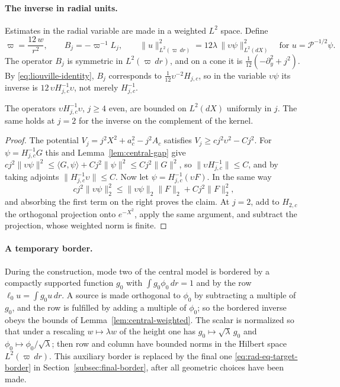 \paragraph{The inverse in radial units.}
Estimates in the radial variable are made in a weighted $L^2$ space.
Define
\begin{equation}\label{eq:rad-eq-ha2}
 \varpi=\frac{12\,w}{r^2},\qquad B_j=-\varpi^{-1}L_j,
 \qquad
 \|u\|_{L^2(\varpi\,dr)}^2=12\lambda\,\|\upsilon\psi\|_{L^2(dX)}^2
 \quad\text{for }u=\mathcal P^{-1/2}\psi .
\end{equation}
The operator $B_j$ is symmetric in $L^2(\varpi\,dr)$, and on a cone it
is $\tfrac1{12}(-\partial_y^2+j^2)$. By \eqref{eq:liouville-identity},
$B_j$ corresponds to $\tfrac1{12}\upsilon^{-2}H_{j,c}$, so in the
variable $\upsilon\psi$ its inverse is
$12\,\upsilon H_{j,c}^{-1}\upsilon$, not merely $H_{j,c}^{-1}$.

\begin{lemma}\label{lem:central-weighted}
The operators $\upsilon H_{j,c}^{-1}\upsilon$, $j\ge4$ even, are
bounded on $L^2(dX)$ uniformly in $j$. The same holds at $j=2$ for the
inverse on the complement of the kernel.
\end{lemma}

\begin{proof}
The potential $V_j=j^2X^2+a_c^2-j^2A_c$ satisfies
$V_j\ge cj^2\upsilon^2-Cj^2$. For $\psi=H_{j,c}^{-1}G$ this and
Lemma~\ref{lem:central-gap} give
$cj^2\|\upsilon\psi\|^2\le\langle G,\psi\rangle+Cj^2\|\psi\|^2
 \le Cj^2\|G\|^2$,
so $\|\upsilon H_{j,c}^{-1}\|\le C$, and by taking adjoints
$\|H_{j,c}^{-1}\upsilon\|\le C$. Now let
$\psi=H_{j,c}^{-1}(\upsilon F)$. In the same way
\[
 cj^2\|\upsilon\psi\|_2^2
 \le\|\upsilon\psi\|_2\|F\|_2+Cj^2\|F\|_2^2 ,
\]
and absorbing the first term on the right proves the claim. At $j=2$,
add to $H_{2,c}$ the orthogonal projection onto $e^{-X^2}$, apply the
same argument, and subtract the projection, whose weighted norm is
finite.
\end{proof}

\paragraph{A temporary border.}
During the construction, mode two of the central model is bordered by
a compactly supported function $g_0$ with $\int g_0\phi_0\,dr=1$ and
by the row $\ell_0u=\int g_0u\,dr$. A source is made orthogonal to
$\phi_0$ by subtracting a multiple of $g_0$, and the row is fulfilled
by adding a multiple of $\phi_0$; so the bordered inverse obeys the
bounds of Lemma~\ref{lem:central-weighted}. The scalar is normalized
so that under a rescaling $w\mapsto\lambda w$ of the height one has
$g_0\mapsto\sqrt\lambda\,g_0$ and $\phi_0\mapsto\phi_0/\sqrt\lambda$;
then row and column have bounded norms in the Hilbert space
$L^2(\varpi\,dr)$. This auxiliary border is replaced by the final one
\eqref{eq:rad-eq-target-border} in
Section~\ref{subsec:final-border}, after all geometric choices have
been made.

